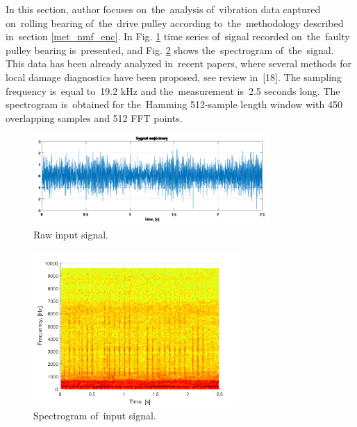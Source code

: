 In this section, author focuses on~the~analysis of~vibration data captured on~rolling bearing of~the~drive pulley according to~the~methodology described in~section \ref{met_nmf_enc}. In Fig. \ref{fig: nmf_raw} time series of~signal recorded on~the~faulty pulley bearing is~presented, and Fig. \ref{fig: nmf_spec} shows the~spectrogram of~the~signal. This data has been already analyzed in~recent papers, where several methods for local damage diagnostics have been proposed, see review in~[18]. The sampling frequency is~equal to~19.2 kHz and the~measurement is~2.5 seconds long. The spectrogram is~obtained for the~Hamming 512-sample length window with 450 overlapping samples and 512 FFT points. 


\begin{figure}[ht!]
\centering
\includegraphics[width = 0.8\textwidth]{wykresy/nmf_raw.png}
\caption{Raw input signal.}
\label{fig: nmf_raw}
\end{figure}

\begin{figure}[ht!]
\centering
\includegraphics[width = 0.7\textwidth]{wykresy/nmf_spec.png}
\caption{Spectrogram of~input signal.}
\label{fig: nmf_spec}
\end{figure}

